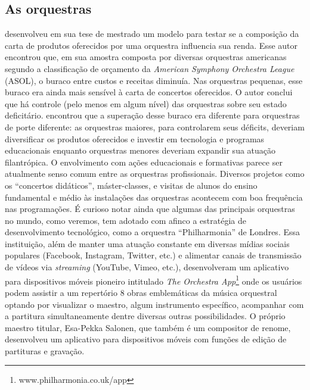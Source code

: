 \documentclass[a4paper, 12pt, openright, oneside, german, french, english, brazil]{abntex2}
\begin{document}
	\subsection{As orquestras}
	
	 desenvolveu em sua tese de mestrado um modelo para testar se a composição da carta de produtos oferecidos por uma orquestra influencia sua renda. Esse autor encontrou que, em sua amostra composta por diversas orquestras americanas segundo a classificação de orçamento da \textit{American Symphony Orchestra League} (ASOL), o buraco entre custos e receitas diminuía. Nas orquestras pequenas, esse buraco era ainda mais sensível à carta de concertos oferecidos. O autor conclui que há controle (pelo menos em algum nível) das orquestras sobre seu estado deficitário.  encontrou que a superação desse buraco era diferente para orquestras de porte diferente: as orquestras maiores, para controlarem seus déficits, deveriam diversificar os produtos oferecidos e investir em tecnologia e programas educacionais enquanto orquestras menores deveriam expandir sua atuação filantrópica. O envolvimento com ações educacionais e formativas parece ser atualmente senso comum entre as orquestras profissionais. Diversos projetos como os ``concertos didáticos'', máster-classes, e visitas de alunos do ensino fundamental e médio às instalações das orquestras acontecem com boa frequência nas programações. É curioso notar ainda que algumas das principais orquestras no mundo, como veremos, tem adotado com afinco a estratégia de desenvolvimento tecnológico, como a orquestra ``Philharmonia'' de Londres. Essa instituição, além de manter uma atuação constante em diversas mídias sociais populares (Facebook, Instagram, Twitter, etc.) e alimentar canais de transmissão de vídeos via \textit{streaming} (YouTube, Vimeo, etc.), desenvolveram um aplicativo para dispositivos móveis pioneiro intitulado \textit{The Orchestra App}\footnote{www.philharmonia.co.uk/app} onde os usuários podem assistir a um repertório 8 obras emblemáticas da música orquestral optando por visualizar o maestro, algum instrumento específico, acompanhar com a partitura simultaneamente dentre diversas outras possibilidades. O próprio maestro titular, Esa-Pekka Salonen, que também é um compositor de renome, desenvolveu um aplicativo para dispositivos móveis com funções de edição de partituras e gravação.
	
\end{document}
